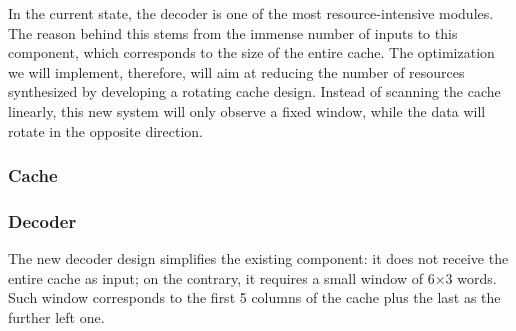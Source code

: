 In the current state, the decoder is one of the most resource-intensive modules. The reason behind this stems from the immense number of inputs to this component, which corresponds to the size of the entire cache. The optimization we will implement, therefore, will aim at reducing the number of resources synthesized by developing a rotating cache design. Instead of scanning the cache linearly, this new system will only observe a fixed window, while the data will rotate in the opposite direction.

\subsubsection{Cache}

\subsubsection{Decoder}

The new decoder design simplifies the existing component: it does not receive the entire cache as input; on the contrary, it requires a small window of 6$\times$3 words. Such window corresponds to the first 5 columns of the cache plus the last as the further left one.

\usetikzlibrary{matrix, positioning, arrows.meta, calc, backgrounds, fit}


